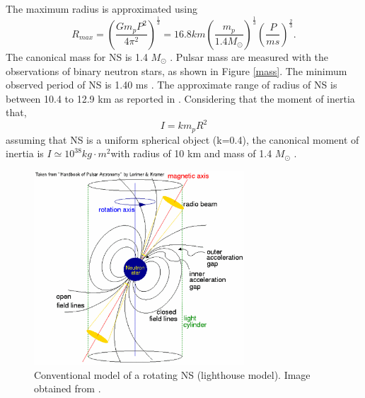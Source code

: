 \documentclass[thesis_msc.tex]{subfiles}
\begin{document}
    The maximum radius is approximated using
    \begin{equation} \label{rmax}
    R_{max}=(\frac{Gm_pP^2}{4\pi^2})^{\frac{1}{3}}=16.8km (\frac{m_p}{1.4M_\odot})^{\frac{1}{3}}(\frac{P}{ms})^{\frac{2}{3}}.
    \end{equation}
    The canonical mass for NS is 1.4 $M_\odot$ %
    \citep{antoniadis2016millisecond}. Pulsar mass are measured with the observations of binary neutron stars, as shown in Figure \ref{mass}. The minimum observed period of NS is 1.40 ms \citep{hessels2006radio}. The approximate range of radius of NS is between 10.4 to 12.9 km as reported in \cite{ozel2016masses}. Considering that the moment of inertia that,   
   \begin{equation} \label{I}
   I=km_pR^2
   \end{equation}
assuming that NS is a uniform spherical object (k=0.4), the canonical moment of inertia is $I\simeq 10^{38} kg\cdot m^2$with radius of 10 km and mass of 1.4 $M_\odot$ . 
    \begin{center}
\begin{figure}[h] \centering
\includegraphics[width=0.7\textwidth]{figures/lhmodel.png}
\caption{Conventional model of a rotating NS (lighthouse model). Image obtained from \citep{handbook}.  }
\label{lhmodel}
\end{figure}
\end{center}   
\end{document}

